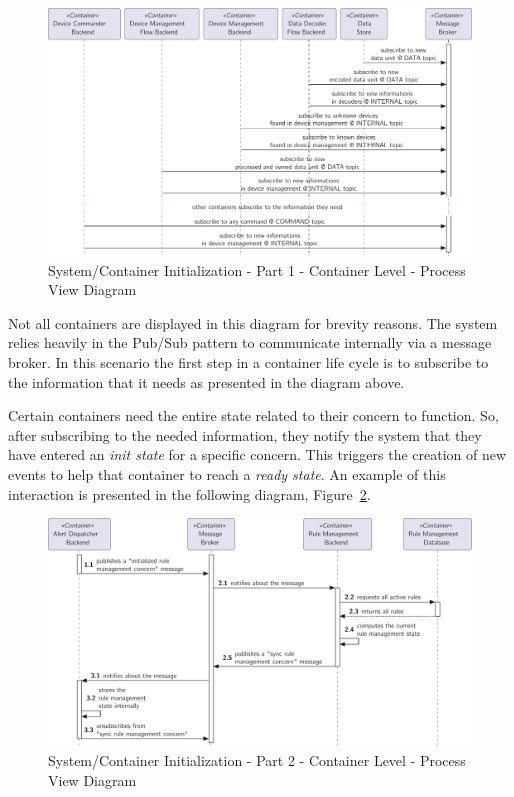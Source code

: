 \begin{figure}[H]
   \centering
   \includegraphics[page=1,width=\columnwidth]{assets/diagrams/design/architectural/level2/process/container-init.pdf}
   \caption[System/Container Initialization - Part 1 - Container Level - Process View Diagram]{System/Container Initialization - Part 1 - Container Level - Process View Diagram}
   \label{fig:design:architecture:platform:container:process:diagram:init}
\end{figure}

Not all containers are displayed in this diagram for brevity reasons.
The system relies heavily in the Pub/Sub \parencite{pubsub} pattern to communicate internally via a message broker. In this scenario the first step in a container life cycle is to subscribe to the information that it needs as presented in the diagram above.

Certain containers need the entire state related to their concern to function. So, after subscribing to the needed information, they notify the system that they have entered an \textit{init state} for a specific concern. This triggers the creation of new events to help that container to reach a \textit{ready state}. An example of this interaction is presented in the following diagram, Figure~\ref{fig:design:architecture:platform:container:process:diagram:ready}.

\begin{figure}[H]
   \centering
   \includegraphics[page=1,width=\columnwidth]{assets/diagrams/design/architectural/level2/process/container-ready.pdf}
   \caption[System/Container Initialization - Part 2 - Container Level - Process View Diagram]{System/Container Initialization - Part 2 - Container Level - Process View Diagram}
   \label{fig:design:architecture:platform:container:process:diagram:ready}
\end{figure}

